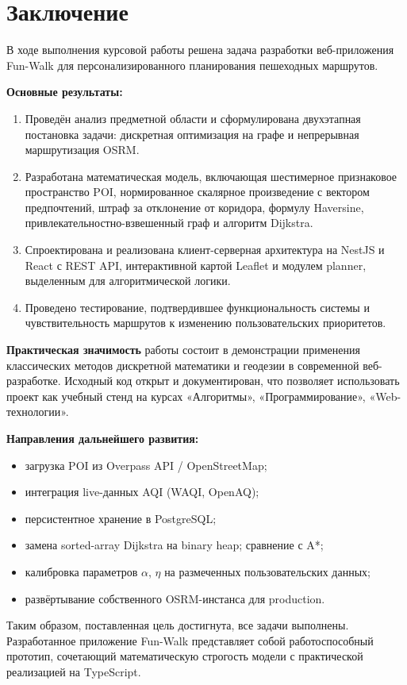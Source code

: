 \chapter{Заключение}
\label{ch:conclusion}

В ходе выполнения курсовой работы решена задача разработки веб-приложения Fun-Walk
для персонализированного планирования пешеходных маршрутов.

\textbf{Основные результаты:}
\begin{enumerate}
  \item Проведён анализ предметной области и сформулирована двухэтапная постановка
        задачи: дискретная оптимизация на графе и непрерывная маршрутизация OSRM.
  \item Разработана математическая модель, включающая шестимерное признаковое
        пространство POI, нормированное скалярное произведение с вектором
        предпочтений, штраф за отклонение от коридора, формулу Haversine,
        привлекательностно-взвешенный граф и алгоритм Dijkstra.
  \item Спроектирована и реализована клиент-серверная архитектура на NestJS и React
        с REST API, интерактивной картой Leaflet и модулем planner, выделенным
        для алгоритмической логики.
  \item Проведено тестирование, подтвердившее функциональность системы и
        чувствительность маршрутов к изменению пользовательских приоритетов.
\end{enumerate}

\textbf{Практическая значимость} работы состоит в демонстрации применения
классических методов дискретной математики и геодезии в современной веб-разработке.
Исходный код открыт и документирован, что позволяет использовать проект как
учебный стенд на курсах «Алгоритмы», «Программирование», «Web-технологии».

\textbf{Направления дальнейшего развития:}
\begin{itemize}
  \item загрузка POI из Overpass API / OpenStreetMap;
  \item интеграция live-данных AQI (WAQI, OpenAQ);
  \item персистентное хранение в PostgreSQL;
  \item замена sorted-array Dijkstra на binary heap; сравнение с A*;
  \item калибровка параметров $\alpha$, $\eta$ на размеченных пользовательских данных;
  \item развёртывание собственного OSRM-инстанса для production.
\end{itemize}

Таким образом, поставленная цель достигнута, все задачи выполнены. Разработанное
приложение Fun-Walk представляет собой работоспособный прототип, сочетающий
математическую строгость модели с практической реализацией на TypeScript.
